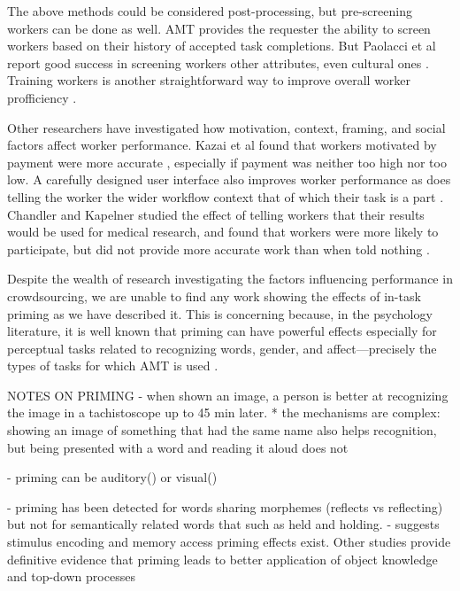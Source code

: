 \documentclass[a4paper]{report}
\begin{document}
The above methods could be considered post-processing, but pre-screening 
workers can be done as well. AMT provides the requester the ability to screen
workers based on their history of accepted task completions. But Paolacci et al
report good success in screening workers other attributes, even cultural ones
\cite{paolacci2010running}.  Training workers is another straightforward way 
to improve overall worker profficiency \cite{le2010ensuring}. 

Other researchers have investigated how motivation, context, framing, and 
social factors affect worker performance.  Kazai et al found that workers 
motivated by payment were more accurate \cite{kazai2013analysis}, especially
if payment was neither too high nor too low.
A carefully designed user interface also improves worker performance 
\cite{Finnerty2013} as does telling the worker the wider workflow context that
of which their task is a part \cite{Kinnaird2012281}. Chandler and Kapelner
studied the effect of telling workers that their results would be used for
medical research, and found that workers were more likely to participate, but
did not provide more accurate work than when told nothing 
\cite{chandler2013breaking}.

Despite the wealth of research investigating the factors influencing 
performance in crowdsourcing, we are unable to find any work showing the 
effects of in-task priming as we have described it.  This is concerning 
because, in the psychology literature, it is well known that priming can have 
powerful effects especially for perceptual tasks related to recognizing 
words, gender, and affect---precisely the types of tasks for which AMT is used
\cite{yuen2011survey, snow2008cheap}.




NOTES ON PRIMING
- when shown an image, a person is better at recognizing the image in a 
	tachistoscope up to 45 min later.\cite{BJOP:BJOP1796}
	* the mechanisms are complex: showing an image of something that had the
		same name also helps recognition, but being presented with a word and
		reading it aloud does not


- priming can be auditory(\cite{BJOP:BJOP1826}) or visual(\cite{BJOP:BJOP1796})

- priming has been detected for words sharing morphemes 
	(reflects vs reflecting) but not for semantically related words that such 
	as held and holding.\cite{BJOP:BJOP1826}
	- suggests stimulus encoding \cite{beller1971priming}\cite{BJOP:BJOP1826}
	\cite{BJOP:BJOP1796} and memory access \cite{beller1971priming} priming 
	effects exist.  Other studies provide definitive evidence that priming
	leads to better application of object knowledge and top-down processes
	\cite{Ghuman17062008}
\end{document}
